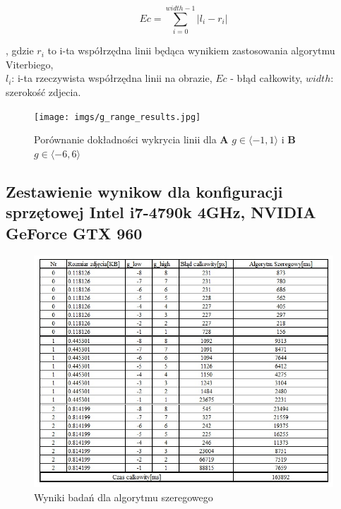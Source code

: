 \documentclass[document.tex]{subfiles}
\begin{document}
\begin{equation}
   Ec = \sum_{i=0}^{width - 1} |l_i - r_i|
    \label{eq:total_error}
\end{equation}

, gdzie $r_i$ to i-ta współrzędna linii będąca wynikiem zastosowania algorytmu Viterbiego, 
\\$l_i$: i-ta rzeczywista współrzędna linii na obrazie, $Ec$ - błąd całkowity, 
$width$: szerokość zdjecia.

\begin{figure}[h]
\texttt{[image: imgs/g\_range\_results.jpg]}
\caption{Porównanie dokładności wykrycia linii dla \textbf{A} $g\in \langle -1, 1 \rangle$ i 
\textbf{B} $g\in \langle -6, 6 \rangle$}
\label{fig:g_range_results}
\end{figure}

\clearpage
\subsection{Zestawienie wynikow dla konfiguracji sprzętowej 
Intel i7-4790k 4GHz, NVIDIA GeForce GTX 960}


\begin{figure}[h]
\includegraphics[scale=0.75]{imgs/results_pc_serial}
\caption{Wyniki badań dla algorytmu szeregowego}
\label{fig:results_pc_serial}
\end{figure}
\end{document}
